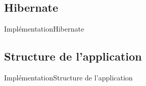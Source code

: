 \subsection{Hibernate}
\begin{frame}{Implémentation}{Hibernate}

\end{frame}

\subsection{Structure de l'application}
\begin{frame}{Implémentation}{Structure de l'application}

\end{frame}